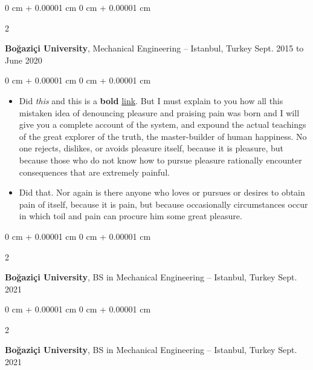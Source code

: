 \documentclass[10pt, letterpaper]{article}
\newenvironment{highlights}{
    \begin{itemize}[
        topsep=0.10 cm,
        parsep=0.10 cm,
        partopsep=0pt,
        itemsep=0pt,
        leftmargin=0 cm + 10pt
    ]
}{
    \end{itemize}
} %
\newenvironment{onecolentry}{
    \begin{adjustwidth}{
        0 cm + 0.00001 cm
    }{
        0 cm + 0.00001 cm
    }
}{
    \end{adjustwidth}
} %
\newenvironment{twocolentry}[2][]{
    \onecolentry
    \def\secondColumn{#2}
    \setcolumnwidth{\fill, 4.5 cm}
    \begin{paracol}{2}
}{
    \switchcolumn \raggedleft \secondColumn
    \end{paracol}
    \endonecolentry
} %
\begin{document}
        \vspace{0.2 cm}

        \begin{twocolentry}{
            Sept. 2015 to June 2020
        }
            \textbf{Boğaziçi University}, Mechanical Engineering -- Istanbul, Turkey\end{twocolentry}

        \vspace{0.10 cm}
        \begin{onecolentry}
            \begin{highlights}
                \item Did \textit{this} and this is a \textbf{bold} \href{https://example.com}{link}. But I must explain to you how all this mistaken idea of denouncing pleasure and praising pain was born and I will give you a complete account of the system, and expound the actual teachings of the great explorer of the truth, the master-builder of human happiness. No one rejects, dislikes, or avoids pleasure itself, because it is pleasure, but because those who do not know how to pursue pleasure rationally encounter consequences that are extremely painful.
                \item Did that. Nor again is there anyone who loves or pursues or desires to obtain pain of itself, because it is pain, but because occasionally circumstances occur in which toil and pain can procure him some great pleasure.
            \end{highlights}
        \end{onecolentry}


        \vspace{0.2 cm}

        \begin{twocolentry}{
            Sept. 2021
        }
            \textbf{Boğaziçi University}, BS in Mechanical Engineering -- Istanbul, Turkey\end{twocolentry}



        \vspace{0.2 cm}

        \begin{twocolentry}{
            Sept. 2021
        }
            \textbf{Boğaziçi University}, BS in Mechanical Engineering -- Istanbul, Turkey\end{twocolentry}
\end{document}
